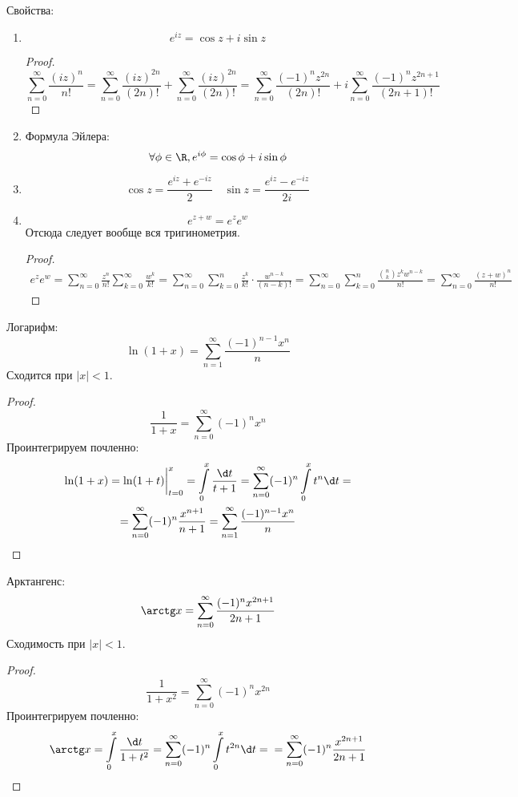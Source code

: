 Свойства:
\begin{enumerate}
\item
	\[ e^{iz} = \cos z + i\sin z \]
	\begin{proof}
		\[
			\sum_{n=0}^\infty \frac{(iz)^n}{n!}
			= \sum_{n=0}^\infty \frac{(iz)^{2n}}{(2n)!} + \sum_{n=0}^\infty \frac{(iz)^{2n}}{(2n)!}
			= \sum_{n=0}^\infty \frac{(-1)^n z^{2n}}{(2n)!} + i \sum_{n=0}^\infty \frac{(-1)^n z^{2n+1}}{(2n+1)!}
		\]
	\end{proof}

\item
	Формула Эйлера:
	\[ \forall \phi \in \R, e^{i\phi} = \cos \phi + i \sin \phi \]

\item
	\[ \cos z = \frac{e^{iz} + e^{-iz}}2 \quad \sin z = \frac{e^{iz} - e^{-iz}}{2i} \]

\item
	\[ e^{z+w} = e^z e^w \]
	Отсюда следует вообще вся тригинометрия.
	\begin{proof}
		\begin{gather*}
			e^z e^w
			= \sum_{n=0}^\infty \frac{z^n}{n!} \sum_{k=0}^\infty \frac{w^k}{k!}
			= \sum_{n=0}^\infty \sum_{k=0}^n \frac{z^k}{k!} \cdot \frac{w^{n-k}}{(n-k)!}
			= \sum_{n=0}^\infty \sum_{k=0}^n \frac{\binom{n}{k} z^k w^{n-k}}{n!}
			= \sum_{n=0}^\infty \frac{(z+w)^n}{n!}
		\end{gather*}
	\end{proof}
\end{enumerate}

Логарифм:
\[
	\ln (1+x) = \sum_{n=1}^\infty \frac{(-1)^{n-1} x^n}n
\]
Сходится при $|x| < 1$.
\begin{proof}
	\[ \frac1{1+x} = \sum_{n=0}^\infty (-1)^nx^n \]
	Проинтегрируем почленно:
	\begin{gather*}
		\ln (1+x)
		= \ln(1+t) \biggr|_{t=0}^x
		= \int\limits_0^x \frac{\d t}{t + 1}
		= \sum_{n=0}^\infty (-1)^n \int\limits_0^x t^n \d t = \\
		= \sum_{n=0}^\infty (-1)^n \frac{x^{n+1}}{n+1}
		= \sum_{n=1}^\infty \frac{(-1)^{n-1} x^n}n
	\end{gather*}
\end{proof}

Арктангенс:
\[
	\arctg x = \sum_{n=0}^\infty \frac{(-1)^n x^{2n+1}}{2n+1}
\]
Сходимость при $|x| < 1$.
\begin{proof}
	\[ \frac1{1+x^2} = \sum_{n=0}^\infty (-1)^nx^{2n} \]
	Проинтегрируем почленно:
	\[
		\arctg x
		= \int\limits_0^x \frac{\d t}{1 + t^2}
		= \sum_{n=0}^\infty (-1)^n \int\limits_0^x t^{2n} \d t = \\
		= \sum_{n=0}^\infty (-1)^n \frac{x^{2n+1}}{2n+1}
	\]
\end{proof}

